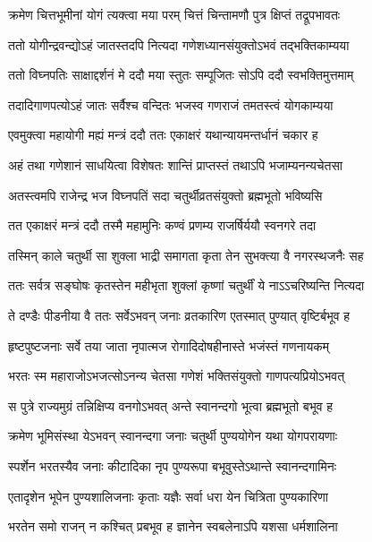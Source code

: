 \twolineshloka
{क्रमेण चित्तभूमीनां योगं त्यक्त्वा मया परम्}
{चित्तं चिन्तामणौ पुत्र क्षिप्तं तद्रूपभावतः} %

\twolineshloka
{ततो योगीन्द्रवन्द्योऽहं जातस्तदपि नित्यदा}
{गणेशध्यानसंयुक्तोऽभवं तद्भक्तिकाम्यया} %

\twolineshloka
{ततो विघ्नपतिः साक्षाद्दर्शनं मे ददौ मया}
{स्तुतः सम्पूजितः सोऽपि ददौ स्वभक्तिमुत्तमाम्} %

\twolineshloka
{तदादिगाणपत्योऽहं जातः सर्वैश्च वन्दितः}
{भजस्व गणराजं तमतस्त्वं योगकाम्यया} %


\twolineshloka
{एवमुक्त्वा महायोगी मह्यं मन्त्रं ददौ ततः}
{एकाक्षरं यथान्यायमन्तर्धानं चकार ह} %

\twolineshloka
{अहं तथा गणेशानं साधयित्वा विशेषतः}
{शान्तिं प्राप्तस्तं तथाऽपि भजाम्यनन्यचेतसा} %

\twolineshloka
{अतस्त्वमपि राजेन्द्र भज विघ्नपतिं सदा}
{चतुर्थीव्रतसंयुक्तो ब्रह्मभूतो भविष्यसि} %

\twolineshloka
{तत एकाक्षरं मन्त्रं ददौ तस्मै महामुनिः}
{कण्वं प्रणम्य राजर्षिर्ययौ स्वनगरे तदा} %

\twolineshloka
{तस्मिन् काले चतुर्थी सा शुक्ला भाद्री समागता}
{कृता तेन सुभक्त्या वै नगरस्थजनैः सह} %

\twolineshloka
{ततः सर्वत्र सङ्घोषः कृतस्तेन महीभृता}
{शुक्लां कृष्णां चतुर्थीं ये नाऽऽचरिष्यन्ति नित्यदा} %

\twolineshloka
{ते दण्डैः पीडनीया वै ततः सर्वेऽभवन् जनाः}
{व्रतकारिण एतस्मात् पुण्यात् वृष्टिर्बभूव ह} %

\twolineshloka
{हृष्टपुष्टजनाः सर्वे तया जाता नृपात्मज}
{रोगादिदोषहीनास्ते भजंस्तं गणनायकम्} %

\twolineshloka
{भरतः स्म महाराजोऽभजत्सोऽनन्य चेतसा}
{गणेशं भक्तिसंयुक्तो गाणपत्यप्रियोऽभवत्} %

\twolineshloka
{स पुत्रे राज्यमुग्रं तन्निक्षिप्य वनगोऽभवत्}
{अन्ते स्वानन्दगो भूत्वा ब्रह्मभूतो बभूव ह} %

\twolineshloka
{क्रमेण भूमिसंस्था येऽभवन् स्वानन्दगा जनाः}
{चतुर्थी पुण्ययोगेन यथा योगपरायणाः} %

\twolineshloka
{स्पर्शेन भरतस्यैव जनाः कीटादिका नृप}
{पुण्यरूपा बभूवुस्तेऽथान्ते स्वानन्दगामिनः} %

\twolineshloka
{एतादृशेन भूपेन पुण्यशालिजनाः कृताः}
{यज्ञैः सर्वा धरा येन चित्रिता पुण्यकारिणा} %

\twolineshloka
{भरतेन समो राजन् न कश्चित् प्रबभूव ह}
{ज्ञानेन स्वबलेनाऽपि यशसा धर्मशालिना} %

